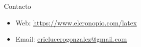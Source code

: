 % 
\begin{alertblock}{Contacto}
    \begin{itemize}
        \item Web: \href{https://www.elcronopio.com/latex}{https://www.elcronopio.com/latex}
        \item Email: \href{mailto:ericlucerogonzalez@gmail.com}{ericlucerogonzalez@gmail.com}
    \end{itemize}
\end{alertblock}

